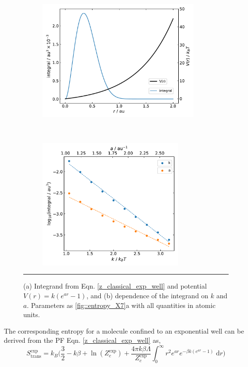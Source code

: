 \documentclass[../main.tex]{subfiles}
\begin{document}
\vspace{0.2cm}
\begin{figure}[h!]
	\begin{subfigure}[t]{0.5\textwidth}
		\centering
		\includegraphics[height=6.2cm]{4/figs/figX8/classical_integrand.pdf}
		\caption{}
	\end{subfigure}%
	~ 
	\begin{subfigure}[t]{0.5\textwidth}
		\centering
		\includegraphics[height=6.7cm]{4/figs/figX8/integrand_a_k.pdf}
		\caption{}
	\end{subfigure}
	\vspace{0.2cm}
	\hrule
	\caption{(a) Integrand from Eqn. \eqref{z_classical_exp_well} and potential $V(r) = k(e^{ar} - 1)$, and (b) dependence of the integrand on $k$ and $a$. Parameters as \figurename{ \ref{fig::entropy_X7}a} with all quantities in atomic units.} 
	\label{fig::entropy_X8}
\end{figure}

The corresponding entropy for a molecule confined to an exponential well can be derived from the PF Eqn. \eqref{z_classical_exp_well} as,
\begin{equation}
S_\text{trans}^\text{exp}= k_B {\Big (} \frac{3}{2} - {k}{\beta} + \ln(Z_c^\text{exp}) + \frac{4\pi k\beta\Lambda}{Z_c^\text{exp}} \int_{0}^{\infty} r^2 e^{ar} e^{-\beta k (e^{ar} - 1)} \; \text{d}r  {\Big )} 
\label{s_ew}
\end{equation}
\end{document}
